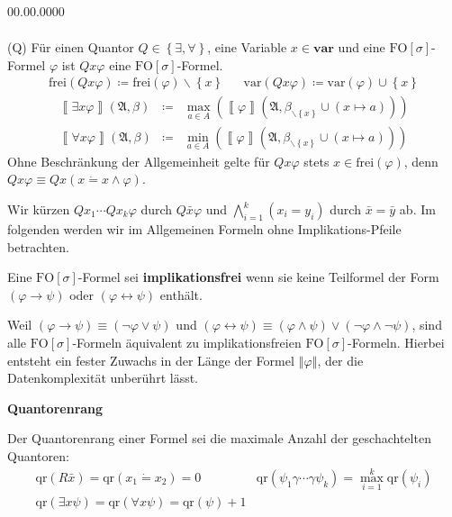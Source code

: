 \begin{labeling}{00.00.0000}
\begin{eqnarray*}
\end{eqnarray*}
\item [{(Q)}] Für einen Quantor $Q\in\left\{ \exists,\forall\right\} $,
eine Variable $x\in\mathbf{var}$ und eine $\mathrm{FO}\left[\sigma\right]$-Formel
$\varphi$ ist $Qx\varphi$ eine $\mathrm{FO}\left[\sigma\right]$-Formel.
\begin{eqnarray*}
\mathrm{frei}\left(Qx\varphi\right)\coloneqq\mathrm{frei}\left(\varphi\right)\backslash\left\{ x\right\}  &  & \mathrm{var}\left(Qx\varphi\right)\coloneqq\mathrm{var}\left(\varphi\right)\cup\left\{ x\right\} 
\end{eqnarray*}
\begin{eqnarray*}
\left\llbracket \exists x\varphi\right\rrbracket \left(\mathfrak{A},\beta\right) & \coloneqq & \max_{a\in A}\left(\left\llbracket \varphi\right\rrbracket \left(\mathfrak{A},\beta_{\backslash\left\{ x\right\} }\cup\left(x\mapsto a\right)\right)\right)\\
\left\llbracket \forall x\varphi\right\rrbracket \left(\mathfrak{A},\beta\right) & \coloneqq & \min_{a\in A}\left(\left\llbracket \varphi\right\rrbracket \left(\mathfrak{A},\beta_{\backslash\left\{ x\right\} }\cup\left(x\mapsto a\right)\right)\right)
\end{eqnarray*}
Ohne Beschränkung der Allgemeinheit gelte für $Qx\varphi$ stets $x\in\mathrm{frei}\left(\varphi\right)$,
denn $Qx\varphi\equiv Qx\left(x\dot{=}x\wedge\varphi\right)$.
\end{labeling}
Wir kürzen $Qx_{1}\cdots Qx_{k}\varphi$ durch $Q\bar{x}\varphi$
und $\bigwedge_{i=1}^{k}\left(x_{i}=y_{i}\right)$ durch $\bar{x}=\bar{y}$
ab. Im folgenden werden wir im Allgemeinen Formeln ohne Implikations-Pfeile
betrachten.
\begin{defn}
Eine $\mathrm{FO}\left[\sigma\right]$-Formel sei \textbf{implikationsfrei
}wenn sie keine Teilformel der Form $\left(\varphi\rightarrow\psi\right)$
oder $\left(\varphi\leftrightarrow\psi\right)$ enthält.
\end{defn}
Weil $\left(\varphi\rightarrow\psi\right)\equiv\left(\neg\varphi\vee\psi\right)$
und $\left(\varphi\leftrightarrow\psi\right)\equiv\left(\varphi\wedge\psi\right)\vee\left(\neg\varphi\wedge\neg\psi\right)$,
sind alle $\mathrm{FO}\left[\sigma\right]$-Formeln äquivalent zu
implikationsfreien $\mathrm{FO}\left[\sigma\right]$-Formeln. Hierbei
entsteht ein fester Zuwachs in der Länge der Formel $\left\Vert \varphi\right\Vert $,
der die Datenkomplexität unberührt lässt.

\begin{defn}
\textbf{\label{def:qr}Quantorenrang}

Der Quantorenrang einer Formel sei die maximale Anzahl der geschachtelten
Quantoren:
\[
\begin{array}{cc}
\mathrm{qr}\left(R\bar{x}\right)=\mathrm{qr}\left(x_{1}\dot{=}x_{2}\right)=0 & \mathrm{qr}\left(\psi_{1}\gamma\cdots\gamma\psi_{k}\right)=\max_{i=1}^{k}\mathrm{qr}\left(\psi_{i}\right)\\
\mathrm{qr}\left(\exists x\psi\right)=\mathrm{qr}\left(\forall x\psi\right)=\mathrm{qr}\left(\psi\right)+1
\end{array}
\]
\end{defn}

